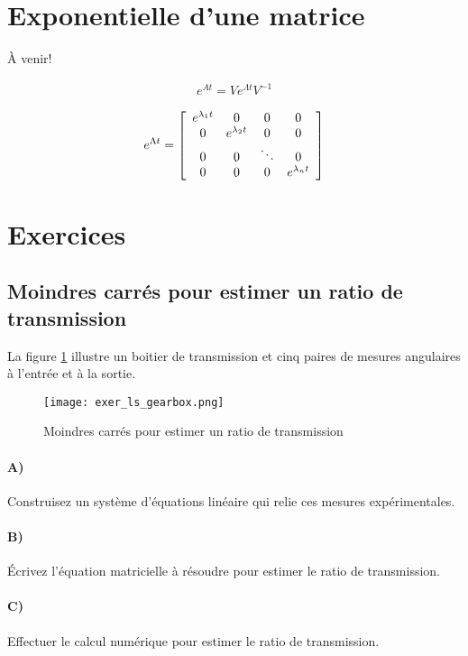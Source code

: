 \section{Exponentielle d'une matrice}

À venir!


\begin{align}
	e^{At} = V e^{\Lambda t} V^{-1}
\end{align}

\begin{align}
	e^{\Lambda t} =
	\left[ \begin{array}{c c c c}
			   e^{\lambda_1 t} &  0          & 0 & 0 \\
			   0         &  e^{\lambda_2 t}  & 0      & 0 \\
			   0         &  0          &\ddots  & 0 \\
			   0         &  0          & 0  & e^{\lambda_n t}
	\end{array} \right]
\end{align}

\newpage
\section{Exercices}

\subsection{Moindres carrés pour estimer un ratio de transmission}

La figure \ref{fig:exer_ls_gearbox} illustre un boitier de transmission et cinq paires de mesures angulaires à l'entrée et à la sortie.
\begin{figure}[H]
	\centering
	\texttt{[image: exer\_ls\_gearbox.png]}
	\caption{Moindres carrés pour estimer un ratio de transmission}
	\label{fig:exer_ls_gearbox}
\end{figure}

\paragraph{A)}
Construisez un système d'équations linéaire qui relie ces mesures expérimentales.

\paragraph{B)}
Écrivez l'équation matricielle à résoudre pour estimer le ratio de transmission.

\paragraph{C)}
Effectuer le calcul numérique pour estimer le ratio de transmission.


